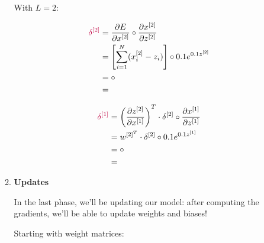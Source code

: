 \documentclass[12pt]{article}
\begin{document}
\begin{enumerate}[leftmargin=\labelsep]
\begin{enumerate}
                With $L = 2$:

                \begin{equation*}
                  \begin{aligned}
                    \textcolor{purple}{\delta^{[2]}} & = \frac{\partial E}{\partial x^{[2]}} \circ \frac{\partial x^{[2]}}{\partial z^{[2]}} \\
                                                     & = \left[\sum_{i=1}^N(x_i^{[2]} - z_i)\right] \circ 0.1e^{0.1z^{[2]}}                  \\
                                                     & =  \circ        \\
                                                     & = 
                  \end{aligned}
                \end{equation*}

                \pagebreak

                \begin{equation*}
                  \begin{aligned}
                    \textcolor{purple}{\delta^{[1]}} & = \left(\frac{\partial z^{[2]}}{\partial x^{[1]}}\right)^T \cdot \delta^{[2]} \circ \frac{\partial x^{[1]}}{\partial z^{[1]}} \\
                                                     & = w^{[2]^T} \cdot \delta^{[2]} \circ 0.1e^{0.1z^{[1]}}                                                                        \\
                                                     & =  \circ                                         \\
                                                     & = 
                  \end{aligned}
                \end{equation*}

          \item \textbf{Updates}

                In the last phase, we'll be updating our model: after computing the gradients,
                we'll be able to update weights and biases!

                Starting with weight matrices:


\end{enumerate}
\end{enumerate}
\end{document}
